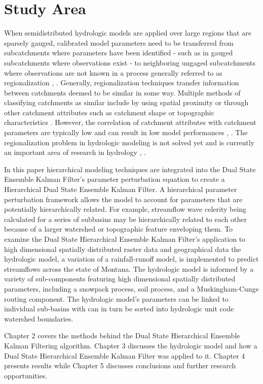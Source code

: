 \section{Study Area}	
	When semidistributed hydrologic models are applied over large regions that are sparsely gauged, calibrated model parameters need to be transferred from subcatchments where parameters have been identified - such as in gauged subcatchments where observations exist - to neighboring ungaged subcatchments where observations are not known in a process generally referred to as regionalization \cite{Bloschl1995}, \cite{Merz2004}. Generally, regionalization techniques transfer information between catchments deemed to be similar in some way. Multiple methods of classifying catchments as similar include by using spatial proximity \cite{Julier1997} or through other catchment attributes such as catchment shape or topographic characteristics \cite{Peel2000}. However, the correlation of catchment attributes with catchment parameters are typically low \cite{Bardossy2007} and can result in low model performances \cite{Seibert1999}, \cite{Beldring2003}. The regionalization problem in hydrologic modeling is not solved yet and is currently an important area of research in hydrology  \cite{Bardossy2007}, \cite{Gotzinger2007}.
 
	In this paper hierarchical modeling techniques are integrated into the Dual State Ensemble Kalman Filter's parameter perturbation equation to create a Hierarchical Dual State Ensemble Kalman Filter. A hierarchical parameter perturbation framework allows the model to account for parameters that are potentially hierarchically related. For example, streamflow wave celerity being calculated for a series of subbasins may be hierarchically related to each other because of a larger watershed or topographic feature enveloping them. To examine the Dual State Hierarchical Ensemble Kalman Filter's application to high dimensional spatially distributed raster data and geographical data the hydrologic model, a variation of a rainfall-runoff model, is implemented to predict streamflows across the state of Montana. The hydrologic model is informed by a variety of sub-components featuring high dimensional spatially distributed parameters, including a snowpack process, soil process, and a Muskingham-Cunge routing component. The hydrologic model's parameters can be linked to individual sub-basins with can in turn be sorted into hydrologic unit code watershed boundaries.
	
	Chapter 2 covers the methods behind the Dual State Hierarchical Ensemble Kalman Filtering algorithm. Chapter 3 discusses the hydrologic model and how a Dual State Hierarchical Ensemble Kalman Filter was applied to it. Chapter 4 presents results while Chapter 5 discusses conclusions and further research opportunities.
	
	